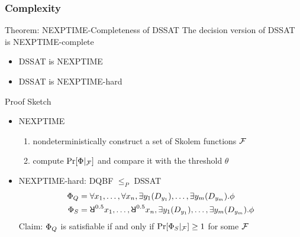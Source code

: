 \begin{frame}
  \frametitle{Complexity}
  \begin{block}{Theorem: NEXPTIME-Completeness of DSSAT}
    The decision version of DSSAT is NEXPTIME-complete
    \begin{itemize}
      \item DSSAT is NEXPTIME
      \item DSSAT is NEXPTIME-hard
    \end{itemize}
  \end{block}
  \pause
  \begin{block}{Proof Sketch}
    \begin{itemize}
      \item NEXPTIME
            \begin{enumerate}
              \item nondeterministically construct a set of Skolem functions $\mathcal{F}$
              \item compute $\Pr[\Phi|_{\mathcal{F}}]$ and compare it with the threshold $\theta$
            \end{enumerate}
      \item NEXPTIME-hard: DQBF $\leq_P$ DSSAT
            \abovedisplayskip=0pt
            \begin{align*}
              \Qf_Q & = \forall x_1, \ldots, \forall x_n, \exists y_1(D_{y_1}), \ldots, \exists y_m(D_{y_m}).\pf           \\
              \Qf_S & = \random{0.5} x_1, \ldots, \random{0.5} x_n, \exists y_1(D_{y_1}), \ldots, \exists y_m(D_{y_m}).\pf
            \end{align*}
            Claim: $\Phi_Q$ is satisfiable if and only if $\Pr[\Phi_S|_{\mathcal{F}}] \geq 1$ for some $\mathcal{F}$
    \end{itemize}
  \end{block}
\end{frame}